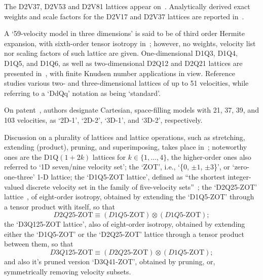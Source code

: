     The D2V37, D2V53 and D2V81 lattices appear on~\cite{2007-PhilippiPC+DosSantosLOE-IntJModPhysC}. Analytically  derived  exact
    weights and scale factors for the D2V17 and D2V37 lattices are reported in~\cite{2007-SiebertDN+PhilippiPC-IntJModPhysC}.

    A `59-velocity model in three dimensions' is said to be of third order Hermite expansion, with sixth-order  tensor  isotropy
    in~\cite{2008-ChenH+ShanX-PhysD}; however, no weights, velocity  list  nor  scaling  factors  of  such  lattice  are  given.
    One-dimensional  D1Q3,  D1Q4,  D1Q5,  and  D1Q6,  as  well  as  two-dimensional  D2Q12  and  D2Q21  lattices  are  presented
    in~\cite{2008-KimSH+BoydID-JComputPhys},      with      finite      Knudsen      number      applications      in      view.
    Reference~\cite{2008-RubinsteinR+LuoLS-PhysRev} studies various two- and three-dimensional lattices of up to 51  velocities,
    while referring to a `DdQq' notation as being `standard'.

    On patent~\cite{2008-ShanX+ZhangR-USPat}, authors designate Cartesian,  space-filling  models  with  21,  37,  39,  and  103
    velocities, as `2D-1', `2D-2', `3D-1', and `3D-2', respectively.

    Discussion on a plurality of lattices and  lattice  operations,  such  as  stretching,  extending  (product),  pruning,  and
    superimposing, takes place in~\cite{2009-ChikatamarlaSS+KarlinIV-PhysRevE}; noteworthy ones are the  D$1$Q$(1+2k)$  lattices
    for $k \in \{1, \ldots, 4\}$, the higher-order ones also referred to `1D seven/nine velocity set'; the `ZOT', i.e.,  `\{$0$,
    $\pm 1$, $\pm 3$\}', or  `zero-one-three'  1-D  lattice;  the  `D1Q5-ZOT  lattice',  defined  as  ``{\swshape  the  shortest
    integer-valued        discrete        velocity        set        in        the        family        of         five-velocity
    sets\/}''~\cite{2006-ChikatamarlaSS+KarlinIV-PhysRevLett};                          the                          `D2Q25-ZOT'
    lattice~\cite{2008-ChikatamarlaSS+KarlinIV-CompPhysComm}, of eight-order isotropy,  obtained  by  extending  the  `D1Q5-ZOT'
    through a tensor product with itself, so that%
    \begin{equation}
        D2Q25\mbox{-ZOT} \equiv (D1Q5\mbox{-ZOT}) \otimes (D1Q5\mbox{-ZOT});
    \end{equation}
    \noindent the `D3Q125-ZOT lattice', also of eight-order iso\-tro\-py, obtained by extending either  the  `D1Q5-ZOT'  or  the
    `D2Q25-ZOT' lattice through a tensor product between them, so that%
    \begin{equation}
        D3Q125\mbox{-ZOT} \equiv (D2Q25\mbox{-ZOT}) \otimes (D1Q5\mbox{-ZOT});
    \end{equation}
    \noindent and also it's pruned version `D3Q41-ZOT', obtained by pruning, or, symmetrically removing velocity subsets.

